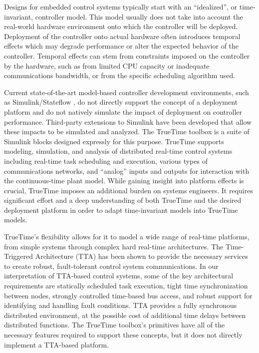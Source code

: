 Designs for embedded control systems typically start with an ``idealized'', or time-invariant, controller model.  This model usually does not take into account the real-world hardware environment onto which the controller will be deployed.  Deployment of the controller onto actual hardware often introduces temporal effects which may degrade performance or alter the expected behavior of the controller.  Temporal effects can stem from constraints imposed on the controller by the hardware, such as from limited CPU capacity or inadequate communications bandwidth, or from the specific scheduling algorithm used.

Current state-of-the-art model-based controller development environments, such as Simulink/Stateflow \cite{Simulink}, do not directly support the concept of a deployment platform and do not natively simulate the impact of deployment on controller performance.  Third-party extensions to Simulink have been developed that allow these impacts to be simulated and analyzed.  The TrueTime toolbox \cite{ec_99,hca_03} is a suite of Simulink blocks designed expressly for this purpose.  TrueTime supports modeling, simulation, and analysis of distributed real-time control systems including real-time task scheduling and execution, various types of communications networks, and ``analog'' inputs and outputs for interaction with the continuous-time plant model.  While gaining insight into platform effects is crucial, TrueTime imposes an additional burden on systems engineers.  It requires significant effort and a deep understanding of both TrueTime and the desired deployment platform in order to adapt time-invariant models into TrueTime models.

TrueTime's flexibility allows for it to model a wide range of real-time platforms, from simple systems through complex hard real-time architectures.  The Time-Triggered Architecture (TTA) \cite{kopetz_97,kb_02,kg_93} has been shown to provide the necessary services to create robust, fault-tolerant control system communications.  In our interpretation of TTA-based control systems, some of the key architectural requirements are statically scheduled task execution, tight time synchronization between nodes, strongly controlled time-based bus access, and robust support for identifying and handling fault conditions.  TTA provides a fully synchronous distributed environment, at the possible cost of additional time delays between distributed functions. The TrueTime toolbox's primitives have all of the necessary features required to support these concepts, but it does not directly implement a TTA-based platform.

